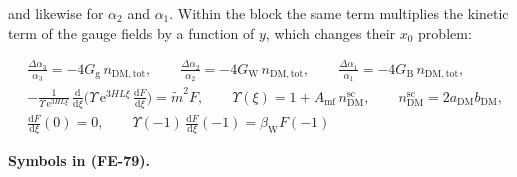 \documentclass[
  10pt,
]{article}
\begin{document}
and likewise for \(\alpha_2\) and \(\alpha_1\). Within the block the
same term multiplies the kinetic term of the gauge fields by a function
of \(y\), which changes their \(x_0\) problem:

\[
\begin{aligned}
&\frac{\Delta\alpha_3}{\alpha_3} = -4G_{\mathrm{g}}\,n_{\mathrm{DM,tot}},\qquad
 \frac{\Delta\alpha_2}{\alpha_2} = -4G_{\mathrm{W}}\,n_{\mathrm{DM,tot}},\qquad
 \frac{\Delta\alpha_1}{\alpha_1} = -4G_{\mathrm{B}}\,n_{\mathrm{DM,tot}},\\
&-\frac{1}{\Upsilon\,\mathrm{e}^{3HL\xi}}\,\frac{\mathrm{d}}{\mathrm{d}\xi}\Big(\Upsilon\,
 \mathrm{e}^{3HL\xi}\,\frac{\mathrm{d}F}{\mathrm{d}\xi}\Big)
 = \tilde m^2F,\qquad \Upsilon(\xi) = 1 + A_{\mathrm{mf}}\,n^{\mathrm{sc}}_{\mathrm{DM}},\qquad
 n^{\mathrm{sc}}_{\mathrm{DM}} = 2a_{\mathrm{DM}}b_{\mathrm{DM}},\\
&\frac{\mathrm{d}F}{\mathrm{d}\xi}(0) = 0,\qquad \Upsilon(-1)\,\frac{\mathrm{d}F}{\mathrm{d}\xi}(-1) =
 \beta_{\mathrm{W}}F(-1)
\end{aligned} \tag{FE-79}
\]

\textbf{Symbols in (FE-79).}
\end{document}
